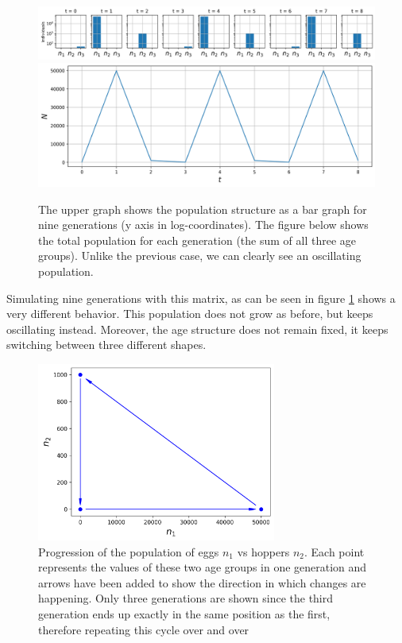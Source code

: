 \documentclass{tufte-book} %
\begin{document}
\begin{figure}
	\begin{center}
		\includegraphics[width=\textwidth]{locusts_evol}
		\includegraphics[width=\textwidth]{tot_locusts_evol}		
	\end{center}
	\caption{The upper graph shows the population structure as a bar graph for nine generations (y axis in log-coordinates). The figure below shows the total population for each generation (the sum of all three age groups). Unlike the previous case, we can clearly see an oscillating population.}
	\label{fig:Llocusts}
\end{figure}

Simulating nine generations with this matrix, as can be seen in figure \ref{fig:Llocusts} shows a very different behavior. This population does not grow as before, but keeps oscillating instead. Moreover, the age structure does not remain fixed, it keeps switching between three different shapes.


\begin{figure}
	\begin{center}
		\includegraphics[width=0.7\textwidth]{locusts_phaseI}	
	\end{center}
	\caption{Progression of the population of eggs $n_1$ vs hoppers $n_2$. Each point represents the values of these two age groups in one generation and arrows have been added to show the direction in which changes are happening. Only three generations are shown since the third generation ends up exactly in the same position as the first, therefore repeating this cycle over and over }
	\label{fig:leslie_locust_phase}
\end{figure}
\end{document}
